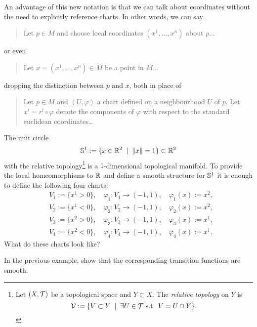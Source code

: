 An advantage of this new notation is that we can talk about coordinates without the need to explicitly reference charts. In other words, we can say
\begin{quote}
  Let $p\in M$ and choose local coordinates $(x^1, \ldots, x^n)$ about $p$...
\end{quote}
or even
\begin{quote}
  Let $x=(x^1, \ldots, x^n)\in M$ be a point in $M$...
\end{quote}
dropping the distinction between $p$ and $x$, both in place of
\begin{quote}
  Let $p \in M$ and $(U, \varphi)$ a chart defined on a neighbourhood $U$ of $p$.
  Let $x^i = r^i \circ\varphi$ denote the components of $\varphi$ with respect to the standard euclidean coordinates\ldots
\end{quote}

\begin{example}\label{ex:S1emb}
  The unit circle
  \begin{equation}
    \mathbb{S}^1 := \{x\in\mathbb{R}^2 \;\mid\; \|x\|=1\}\subset\mathbb{R}^2
  \end{equation}
  with the relative topology\footnote{Let $(X,\mathcal{T})$ be a topological space and $Y\subset X$. The \emph{relative topology} on $Y$ is \begin{equation}\mathcal{V}:=\{V\subset Y\;\mid\;\exists U\in\mathcal{T} \mbox{ s.t. } V = U \cap Y\}.\end{equation}} is a $1$-dimensional topological manifold.
  To provide the local homeomorphisms to $\mathbb{R}$ and define a smooth structure for $\mathbb{S}^1$ it is enough to define the following four charts:
  \begin{equation}
    \begin{aligned}
       & V_1 := \{ x^1 > 0 \},\quad \varphi_1: V_1 \to (-1, 1), \quad \varphi_1(x) := x^2, \\
       & V_2 := \{ x^1 < 0 \},\quad \varphi_2: V_2 \to (-1, 1), \quad \varphi_2(x) := x^2, \\
       & V_3 := \{ x^2 > 0 \},\quad \varphi_3: V_3 \to (-1, 1), \quad \varphi_3(x) := x^1, \\
       & V_4 := \{ x^2 < 0 \},\quad \varphi_4: V_4 \to (-1, 1), \quad \varphi_4(x) := x^1.
    \end{aligned}
  \end{equation}
  What do these charts look like?
\end{example}
\begin{exercise}
  In the previous example, show that the corresponding transition functions are smooth.
\end{exercise}



